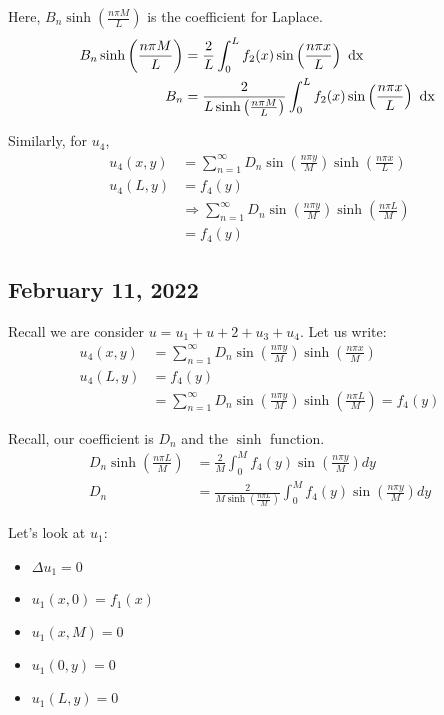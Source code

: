 Here, $B_n \sinh\left( \frac{n \pi M}{L}\right)$ is the coefficient for Laplace.
%
\begin{align}
  B_n \sinh \left( \frac{n \pi M}{L} \right) & = \frac{2}{L} \int^L_0 f_2(x) \sin\left(\frac{n \pi x}{L}\right) \text{ dx }\\
  B_n & = \frac{2}{L \sinh\left(\frac{n \pi M}{L}\right)} \int^L_0 f_2(x) \sin\left(\frac{n \pi x}{L}\right) \text{ dx }
\end{align}

Similarly, for $u_4$,
%
\begin{align}
  u_4(x, y) & = \sum^\infty_{n = 1} D_n \sin\left(\frac{n \pi y}{M}\right)\sinh\left(\frac{n \pi x}{L}\right)\\
  u_4(L, y) & = f_4(y)\\
  & \Rightarrow \sum^\infty_{n = 1} D_n \sin\left(\frac{n \pi y}{M}\right) \sinh\left(\frac{n \pi L}{M}\right)\\
  & = f_4(y)
\end{align}

\bigbreak

\subsection*{February 11, 2022}
Recall we are consider $u = u_1 + u+2 + u_3 + u_4$. Let us write:
%
\begin{align}
  u_4(x, y) & = \sum^\infty_{n = 1} D_n \sin\left( \frac{n \pi y}{M}\right)\sinh\left(\frac{n \pi x}{M}\right)\\
  u_4(L, y) & = f_4(y)\\
  & = \sum^\infty_{n = 1} D_n \sin\left( \frac{n \pi y}{M} \right) \sinh\left( \frac{n \pi L}{M} \right) = f_4(y)
\end{align}

Recall, our coefficient is $D_n$ and the $\sinh$ function.
%
\begin{align}
  D_n \sinh\left( \frac{n \pi L}{M} \right) & =
  \frac{2}{M} \int^M_0 f_4(y) \sin\left( \frac{n \pi y}{M} \right) dy\\
  D_n & = \frac{2}{M \sinh\left( \frac{n \pi L}{M} \right)} \int^M_0 f_4(y) \sin\left( \frac{n \pi y}{M} \right) dy
\end{align}

Let's look at $u_1$:
\begin{itemize}
  \item $\Delta u_1 = 0$
  \item $u_1(x, 0) = f_1(x)$
  \item $u_1(x, M) = 0$
  \item $u_1(0, y) = 0$
  \item $u_1(L, y) = 0$
\end{itemize}

